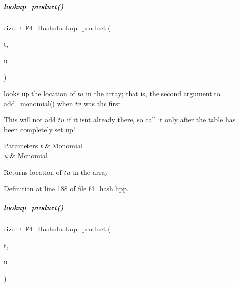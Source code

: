 \mbox{\label{group___g_b_computation_a539f858e09579b9119941795e42cdc4f}} 
\subparagraph{\texorpdfstring{lookup\+\_\+product()}{lookup\_product()}\hspace{0.1cm}{\footnotesize\ttfamily [1/2]}}
{\footnotesize\ttfamily size\+\_\+t F4\+\_\+\+Hash\+::lookup\+\_\+product (\begin{DoxyParamCaption}\item[{const \hyperlink{group__polygroup_class_monomial}{Monomial} \&}]{t,  }\item[{const \hyperlink{group__polygroup_class_monomial}{Monomial} \&}]{u }\end{DoxyParamCaption})\hspace{0.3cm}{\ttfamily [inline]}}



looks up the location of $tu$ in the array; that is, the second argument to {\ttfamily \hyperlink{group___g_b_computation_aaed2c308a7d79e098e6555d20b1720d0}{add\+\_\+monomial()}} when $tu$ was the first 

This will not add $tu$ if it isn\textquotesingle{}t already there, so call it only after the table has been completely set up! 
\begin{DoxyParams}{Parameters}
{\em t} & {\ttfamily \hyperlink{group__polygroup_class_monomial}{Monomial}} \\
\hline
{\em u} & {\ttfamily \hyperlink{group__polygroup_class_monomial}{Monomial}} \\
\hline
\end{DoxyParams}
\begin{DoxyReturn}{Returns}
location of $tu$ in the array 
\end{DoxyReturn}


Definition at line 188 of file f4\+\_\+hash.\+hpp.

\mbox{\label{group___g_b_computation_a9eef1cd0bf6fd57e97b6d10d42b3c6d2}} 
\subparagraph{\texorpdfstring{lookup\+\_\+product()}{lookup\_product()}\hspace{0.1cm}{\footnotesize\ttfamily [2/2]}}
{\footnotesize\ttfamily size\+\_\+t F4\+\_\+\+Hash\+::lookup\+\_\+product (\begin{DoxyParamCaption}\item[{const \hyperlink{group__polygroup_class_monomial}{Monomial} \&}]{t,  }\item[{const E\+X\+P\+\_\+\+T\+Y\+PE $\ast$}]{u }\end{DoxyParamCaption})\hspace{0.3cm}{\ttfamily [inline]}}



